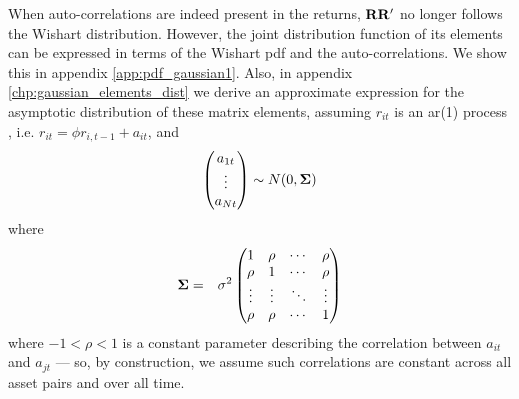 When auto-correlations are indeed present in the returns, $\mathbf{RR'}$
no longer follows the Wishart distribution. However, the joint distribution
function of its elements can be expressed in terms of the Wishart \gls{pdf}
and the auto-correlations. We show this in appendix
\ref{app:pdf_gaussian1}. Also, in appendix
\ref{chp:gaussian_elements_dist} we derive an approximate expression
for the asymptotic distribution of these matrix elements, assuming
$r_{it}$ is an \gls{ar}(1) process \footnotemark, i.e. $r_{it} =
\phi r_{i, t-1} + a_{it}$, and
\begin{eqnarray*}
  \begin{pmatrix}
    a_{1t} \\
    \vdots \\
    a_{Nt}
  \end{pmatrix} \sim N(0, \mathbf{\Sigma})
\end{eqnarray*}
where
\begin{eqnarray*}
  \mathbf{\Sigma} &=& \sigma^2
  \begin{pmatrix}
    1 & \rho & \cdots & \rho \\
    \rho & 1 & \cdots & \rho \\
    \vdots & \vdots & \ddots & \vdots \\
    \rho & \rho & \cdots & 1
  \end{pmatrix}
\end{eqnarray*}
where $-1 < \rho < 1$ is a constant parameter describing the correlation
between $a_{it}$ and $a_{jt}$ --- so, by construction, we assume such
correlations are constant across all asset pairs and over all
time.

